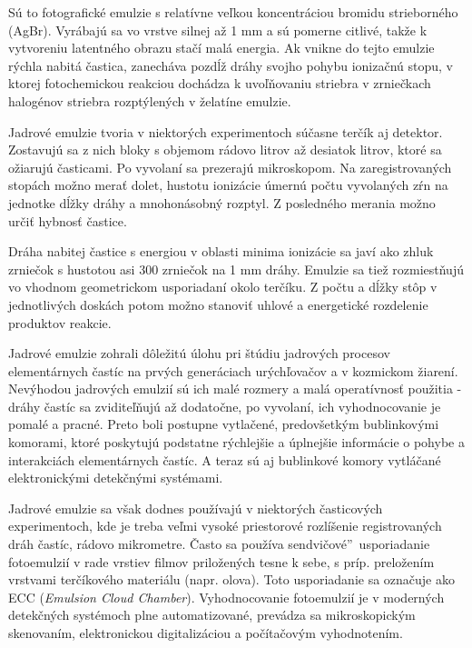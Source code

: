 \documentclass[../../main.tex]{subfiles}
\begin{document}
Sú to fotografické emulzie s relatívne veľkou koncentráciou bromidu strieborného (AgBr). Vyrábajú sa vo vrstve silnej až 1 mm a sú pomerne citlivé, takže k vytvoreniu latentného obrazu stačí malá energia. Ak vnikne do tejto emulzie rýchla nabitá častica, zanecháva pozdĺž dráhy svojho pohybu ionizačnú stopu, v ktorej fotochemickou reakciou dochádza k uvoľňovaniu striebra v zrniečkach halogénov striebra rozptýlených v želatíne emulzie.

Jadrové emulzie tvoria v niektorých experimentoch súčasne terčík aj detektor. Zostavujú sa z nich bloky s objemom rádovo litrov až desiatok litrov, ktoré sa ožiarujú časticami. Po vyvolaní sa prezerajú mikroskopom. Na zaregistrovaných stopách možno merať dolet, hustotu ionizácie úmernú počtu vyvolaných zŕn na jednotke dĺžky dráhy a mnohonásobný rozptyl. Z posledného merania možno určiť hybnosť častice.

Dráha nabitej častice s energiou v oblasti minima ionizácie sa javí ako zhluk zrniečok s hustotou asi 300 zrniečok na 1 mm dráhy. Emulzie sa tiež rozmiestňujú vo vhodnom geometrickom usporiadaní okolo terčíku. Z počtu a dĺžky stôp v jednotlivých doskách potom možno stanoviť uhlové a energetické rozdelenie produktov reakcie.

Jadrové emulzie zohrali dôležitú úlohu pri štúdiu jadrových procesov elementárnych častíc na prvých generáciach urýchľovačov a v kozmickom žiarení. Nevýhodou jadrových emulzií sú ich malé rozmery a malá operatívnosť použitia - dráhy častíc sa zviditeľňujú až dodatočne, po vyvolaní, ich vyhodnocovanie je pomalé a pracné. Preto boli postupne vytlačené, predovšetkým bublinkovými komorami, ktoré poskytujú podstatne rýchlejšie a úplnejšie informácie o pohybe a interakciách elementárnych častíc. A teraz sú aj bublinkové komory vytláčané elektronickými detekčnými systémami.

Jadrové emulzie sa však dodnes používajú v niektorých časticových experimentoch, kde je treba veľmi vysoké priestorové rozlíšenie registrovaných dráh častíc, rádovo mikrometre. Často sa používa \quotedblbase sendvičové\textquotedblright ~usporiadanie fotoemulzií v rade vrstiev filmov priložených tesne k sebe, s príp. preložením vrstvami terčíkového materiálu (napr. olova). Toto usporiadanie sa označuje ako ECC (\textit{Emulsion Cloud Chamber}). Vyhodnocovanie fotoemulzií je v moderných detekčných systémoch plne automatizované, prevádza sa mikroskopickým skenovaním, elektronickou digitalizáciou a počítačovým vyhodnotením. 
\end{document}
